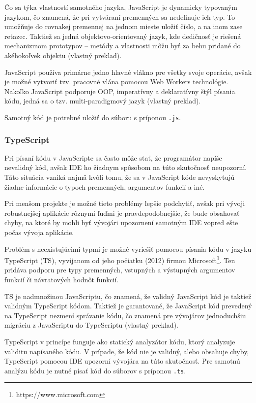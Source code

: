 Čo sa týka vlastností samotného jazyka, JavaScript je dynamicky typovaným jazykom, čo znamená, že pri vytváraní premenných sa nedefinuje ich typ. To umožňuje do rovnakej premennej na jednom mieste uložiť číslo, a na inom zase reťazec. Taktiež sa jedná objektovo-orientovaný jazyk, kde dedičnosť je riešená mechanizmom prototypov -- metódy a vlastnosti môžu byť za behu pridané do akéhokoľvek objektu \cite{ecmascript_specification} (vlastný preklad).

JavaScript používa primárne jedno hlavné vlákno pre všetky svoje operácie, avšak je možné vytvoriť tzv. pracovné vlána pomocou Web Workers technológie. Nakoľko JavaScript podporuje OOP, imperatívny a deklaratívny štýl písania kódu, jedná sa o tzv. multi-paradigmový jazyk \cite{ecmascript_specification} (vlastný preklad).

Samotný kód je potrebné uložiť do súboru s príponou \texttt{.js}.

\subsubsection {TypeScript}
Pri písaní kódu v JavaScripte sa často môže stať, že programátor napíše nevalidný kód, avšak IDE ho žiadnym spôsobom na túto skutočnosť neupozorní. Táto situácia vzniká najmä kvôli tomu, že sa v JavaScript kóde nevyskytujú žiadne informácie o typoch premenných, argumentov funkcií a iné.

Pri menšom projekte je možné tieto problémy lepšie podchytiť, avšak pri vývoji robustnejšej aplikácie rôznymi ľuďmi je pravdepodobnejšie, že bude obsahovať chyby, na ktoré by mohli byť vývojári upozornení samotným IDE vopred ešte počas vývoja aplikácie.

Problém s neexistujúcimi typmi je možné vyriešiť pomocou písania kódu v jazyku TypeScript (TS), vyvíjanom od jeho počiatku (2012) firmou Microsoft\footnote{https://www.microsoft.com}. Ten pridáva podporu pre typy premenných, vstupných a výstupných argumentov funkcií či návratových hodnôt funkcií.

TS je nadmnožinou JavaScriptu, čo znamená, že validný JavaScript kód je taktiež validným TypeScript kódom. Taktiež je garantované, že JavaScript kód prevedený na TypeScript nezmení správanie kódu, čo znamená pre vývojárov jednoduchšiu migráciu z JavaScriptu do TypeScriptu \cite{about_typescript} (vlastný preklad).

TypeScript v princípe funguje ako statický analyzátor kódu, ktorý analyzuje validitu napísaného kódu. V prípade, že kód nie je validný, alebo obsahuje chyby, TypeScript pomocou IDE upozorní vývojára na túto skutočnosť. Pre samotnú analýzu kódu je nutné písať kód do súborov s príponou \texttt{.ts}.

